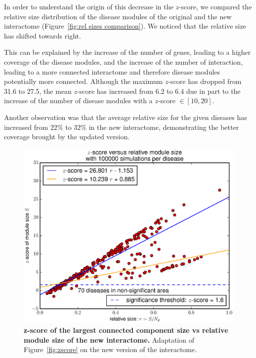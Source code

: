 \documentclass[letterpaper]{article}
\begin{document}
	In order to understand the origin of this decrease in the $z$-score, we compared the relative size
	distribution of the disease modules of the original and the new interactome
	(Figure~\ref{fig:rel sizes comparison}). We noticed that the relative size has shifted towards right.

	This can be explained by the increase of the number of genes, leading to a higher coverage of the disease
	modules, and the increase of the number of interaction, leading to a more connected interactome and
	therefore disease modules potentially more connected. Although the maximum $z$-score has dropped from
	31.6 to 27.5, the mean $z$-score has increased from 6.2 to 6.4 due in part to the increase of the number
	of disease modules with a $z$-score $\in [10, 20]$.

	Another observation was that the average relative size for the given diseases has increased from $22\%$
	to $32\%$ in the new interactome, demonstrating the better coverage brought by the updated version.

	\begin{figure}[!h]
		\hspace{-.6cm}
		\includegraphics[width=.55\textwidth]{images/new_interactome_S4.b100000.eps}
		\vspace{-.7cm}
		\caption{{\bf z-score of the largest connected component size vs relative module size of the new interactome.}
		Adaptation of Figure~\ref{fig:zscore} on the new version of the interactome.
		\label{fig:new interactome zscore}}
		\vspace{-.6cm}
	\end{figure}
\end{document}
